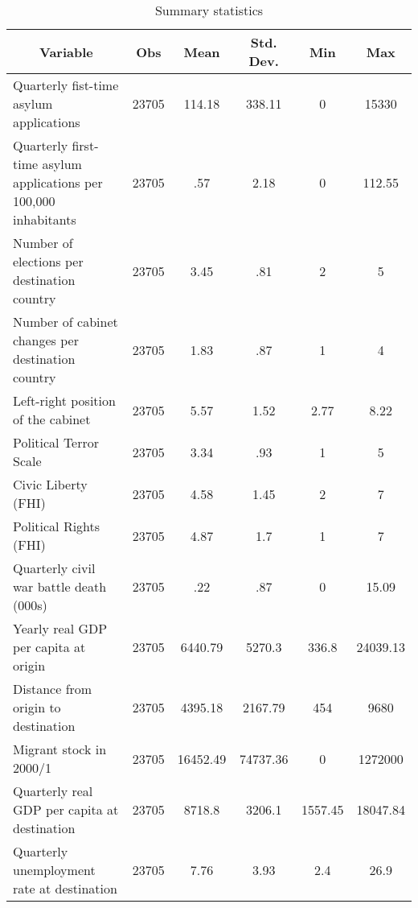 \begin{table}[htbp]\centering \caption{Summary statistics\label{sumstat}}
\begin{tabular}{l c c c c c }\hline\hline
\multicolumn{1}{c}{Variable} & Obs & Mean & Std. Dev.
 & Min & Max  \\ \hline
Quarterly fist-time asylum applications & 23705 & 114.18 & 338.11 & 0 & 15330  \\
Quarterly first-time asylum applications per 100,000 inhabitants & 23705 & .57 & 2.18 & 0 & 112.55  \\
Number of elections per destination country & 23705 & 3.45 & .81 & 2 & 5  \\
Number of cabinet changes per destination country & 23705 & 1.83 & .87 & 1 & 4  \\
Left-right position of the cabinet & 23705 & 5.57 & 1.52 & 2.77 & 8.22  \\
Political Terror Scale & 23705 & 3.34 & .93 & 1 & 5  \\
Civic Liberty (FHI) & 23705 & 4.58 & 1.45 & 2 & 7  \\
Political Rights (FHI) & 23705 & 4.87 & 1.7 & 1 & 7  \\
Quarterly civil war battle death (000s) & 23705 & .22 & .87 & 0 & 15.09  \\
Yearly real GDP per capita at origin & 23705 & 6440.79 & 5270.3 & 336.8 & 24039.13  \\
Distance from origin to destination & 23705 & 4395.18 & 2167.79 & 454 & 9680  \\
Migrant stock in 2000/1 & 23705 & 16452.49 & 74737.36 & 0 & 1272000  \\
Quarterly real GDP per capita at destination & 23705 & 8718.8 & 3206.1 & 1557.45 & 18047.84  \\
Quarterly unemployment rate at destination & 23705 & 7.76 & 3.93 & 2.4 & 26.9  \\
\hline\end{tabular}
\end{table}

